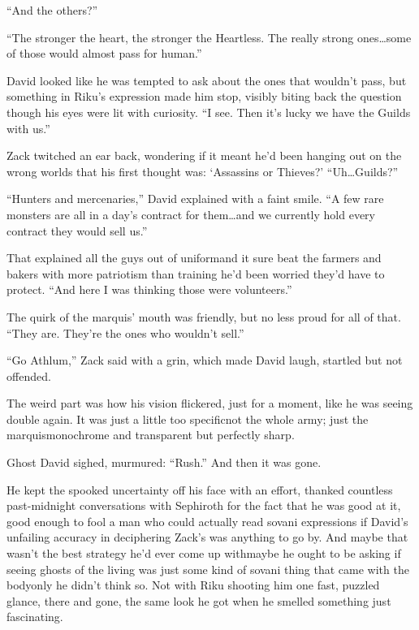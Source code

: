 ``And the others?''

``The stronger the heart, the stronger the Heartless. The really strong ones\ldots some of those would almost pass for human.''

David looked like he was tempted to ask about the ones that wouldn't pass, but something in Riku's expression made him stop, visibly biting back the question though his eyes were lit with curiosity. ``I see. Then it's lucky we have the Guilds with us.''

Zack twitched an ear back, wondering if it meant he'd been hanging out on the wrong worlds that his first thought was: `Assassins or Thieves?' ``Uh\ldots Guilds?''

``Hunters and mercenaries,'' David explained with a faint smile. ``A few rare monsters are all in a day's contract for them\ldots and we currently hold every contract they would sell us.''

That explained all the guys out of uniform\textemdash and it sure beat the farmers and bakers with more patriotism than training he'd been worried they'd have to protect. ``And here I was thinking those were volunteers.''

The quirk of the marquis' mouth was friendly, but no less proud for all of that. ``They are. They're the ones who wouldn't sell.''

``Go Athlum,'' Zack said with a grin, which made David laugh, startled but not offended.

The weird part was how his vision flickered, just for a moment, like he was seeing double again. It was just a little too specific\textemdash not the whole army; just the marquis\textemdash monochrome and transparent but perfectly sharp.

Ghost David sighed, murmured: ``Rush.'' And then it was gone.

He kept the spooked uncertainty off his face with an effort, thanked countless past-midnight conversations with Sephiroth for the fact that he was good at it, good enough to fool a man who could actually read sovani expressions if David's unfailing accuracy in deciphering Zack's was anything to go by. And maybe that wasn't the best strategy he'd ever come up with\textemdash maybe he ought to be asking if seeing ghosts of the living was just some kind of sovani thing that came with the body\textemdash only he didn't think so. Not with Riku shooting him one fast, puzzled glance, there and gone, the same look he got when he smelled something just fascinating.

